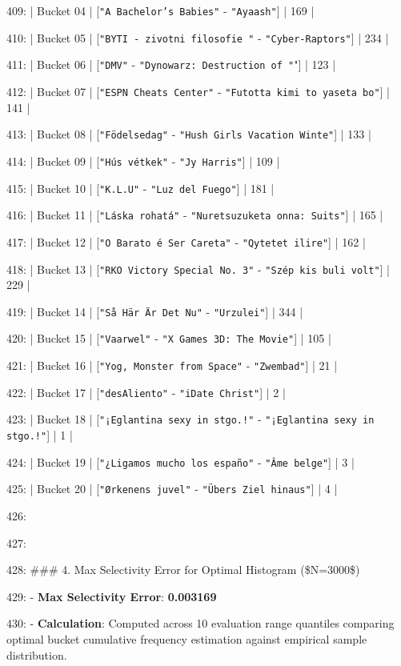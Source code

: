 \documentclass[11pt,a4paper]{article}
\begin{document}
{{{409: | Bucket 04 | [\texttt{"A Bachelor's Babies"} - \texttt{"Ayaash"}] | 169 |

410: | Bucket 05 | [\texttt{"BYTI - zivotni filosofie "} - \texttt{"Cyber-Raptors"}] | 234 |

411: | Bucket 06 | [\texttt{"DMV"} - \texttt{"Dynowarz: Destruction of "}"] | 123 |

412: | Bucket 07 | [\texttt{"ESPN Cheats Center"} - \texttt{"Futotta kimi to yaseta bo"}] | 141 |

413: | Bucket 08 | [\texttt{"Födelsedag"} - \texttt{"Hush Girls Vacation Winte"}] | 133 |

414: | Bucket 09 | [\texttt{"Hús vétkek"} - \texttt{"Jy Harris"}] | 109 |

415: | Bucket 10 | [\texttt{"K.L.U"} - \texttt{"Luz del Fuego"}] | 181 |

416: | Bucket 11 | [\texttt{"Láska rohatá"} - \texttt{"Nuretsuzuketa onna: Suits"}] | 165 |

417: | Bucket 12 | [\texttt{"O Barato é Ser Careta"} - \texttt{"Qytetet ilire"}] | 162 |

418: | Bucket 13 | [\texttt{"RKO Victory Special No. 3"} - \texttt{"Szép kis buli volt"}] | 229 |

419: | Bucket 14 | [\texttt{"Så Här Är Det Nu"} - \texttt{"Urzulei"}] | 344 |

420: | Bucket 15 | [\texttt{"Vaarwel"} - \texttt{"X Games 3D: The Movie"}] | 105 |

421: | Bucket 16 | [\texttt{"Yog, Monster from Space"} - \texttt{"Zwembad"}] | 21 |

422: | Bucket 17 | [\texttt{"desAliento"} - \texttt{"iDate Christ"}] | 2 |

423: | Bucket 18 | [\texttt{"¡Eglantina sexy in stgo.!"} - \texttt{"¡Eglantina sexy in stgo.!"}] | 1 |

424: | Bucket 19 | [\texttt{"¿Ligamos mucho los españo"} - \texttt{"Âme belge"}] | 3 |

425: | Bucket 20 | [\texttt{"Ørkenens juvel"} - \texttt{"Übers Ziel hinaus"}] | 4 |

426:

427:

428: \#\#\# 4. Max Selectivity Error for Optimal Histogram (\$N=3000\$)

429: - \textbf{Max Selectivity Error}: \textbf{0.003169}

430: - \textbf{Calculation}: Computed across 10 evaluation range quantiles comparing optimal bucket cumulative frequency estimation against empirical sample distribution.

}}}
\end{document}
